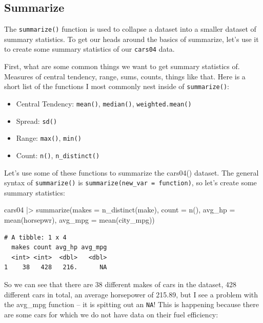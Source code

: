 \documentclass[
  letterpaper,
]{book}
\newenvironment{Shaded}{\begin{snugshade}}{\end{snugshade}}
\newcommand{\AttributeTok}[1]{\textcolor[rgb]{0.40,0.45,0.13}{#1}}
\newcommand{\FunctionTok}[1]{\textcolor[rgb]{0.28,0.35,0.67}{#1}}
\newcommand{\NormalTok}[1]{\textcolor[rgb]{0.00,0.23,0.31}{#1}}
\newcommand{\SpecialCharTok}[1]{\textcolor[rgb]{0.37,0.37,0.37}{#1}}
\providecommand{\tightlist}{%
  \setlength{\itemsep}{0pt}\setlength{\parskip}{0pt}}\usepackage{longtable,booktabs,array}
\begin{document}
\subsection{Summarize}\label{summarize}

The \texttt{summarize()} function is used to collapse a dataset into a
smaller dataset of summary statistics. To get our heads around the
basics of summarize, let's use it to create some summary statistics of
our \texttt{cars04} data.

First, what are some common things we want to get summary statistics of.
Measures of central tendency, range, sums, counts, things like that.
Here is a short list of the functions I most commonly nest inside of
\texttt{summarize()}:

\begin{itemize}
\tightlist
\item
  Central Tendency: \texttt{mean()}, \texttt{median()},
  \texttt{weighted.mean()}
\item
  Spread: \texttt{sd()}
\item
  Range: \texttt{max()}, \texttt{min()}
\item
  Count: \texttt{n()}, \texttt{n\_distinct()}
\end{itemize}

Let's use some of these functions to summarize the cars04() dataset. The
general syntax of \texttt{summarize()} is
\texttt{summarize(new\_var\ =\ function)}, so let's create some summary
statistics:

\begin{Shaded}
\begin{Highlighting}[]
\NormalTok{cars04 }\SpecialCharTok{|\textgreater{}} 
  \FunctionTok{summarize}\NormalTok{(}\AttributeTok{makes =} \FunctionTok{n\_distinct}\NormalTok{(make),}
            \AttributeTok{count =} \FunctionTok{n}\NormalTok{(),}
            \AttributeTok{avg\_hp =} \FunctionTok{mean}\NormalTok{(horsepwr),}
            \AttributeTok{avg\_mpg =} \FunctionTok{mean}\NormalTok{(city\_mpg))}
\end{Highlighting}
\end{Shaded}

\begin{verbatim}
# A tibble: 1 x 4
  makes count avg_hp avg_mpg
  <int> <int>  <dbl>   <dbl>
1    38   428   216.      NA
\end{verbatim}

So we can see that there are 38 different makes of cars in the dataset,
428 different cars in total, an average horsepower of 215.89, but I see
a problem with the avg\_mpg function -- it is spitting out an
\texttt{NA}! This is happening because there are some cars for which we
do not have data on their fuel efficiency:
\end{document}
